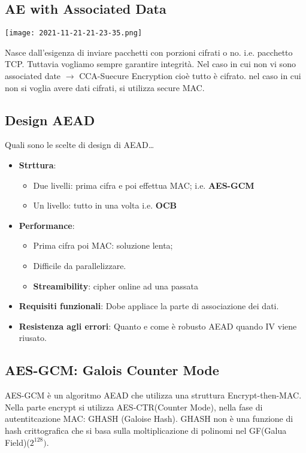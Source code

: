 \documentclass{article}
\theoremstyle{remark}
\begin{document}
\subsection{AE with Associated Data}
\begin{center}
    \texttt{[image: 2021-11-21-21-23-35.png]}
\end{center}
Nasce dall'esigenza di inviare pacchetti con porzioni cifrati o no. i.e. pacchetto TCP. Tuttavia vogliamo sempre garantire
integrità.\newline
Nel caso in cui non vi sono associated date $\rightarrow$ CCA-Suecure Encryption cioè tutto è cifrato. nel caso in cui non si
voglia avere dati cifrati, si utilizza secure MAC.
\subsection{Design AEAD}
Quali sono le scelte di design di AEAD\dots
\begin{itemize}
        \item \textbf{Strttura}: \begin{itemize}
        \item Due livelli: prima cifra e poi effettua MAC; i.e. \textbf{AES-GCM}
        \item Un livello: tutto in una volta i.e. \textbf{OCB}
         \end{itemize}
        \item \textbf{Performance}: \begin{itemize}
        \item Prima cifra poi MAC: soluzione lenta;
        \item Difficile da parallelizzare.
        \item \textbf{Streamibility}: cipher online ad una passata
    \end{itemize}
    \item \textbf{Requisiti funzionali}: Dobe appliace la parte di associazione dei dati.
    \item \textbf{Resistenza agli errori}: Quanto e come è robusto AEAD quando IV viene riusato.
\end{itemize}
\subsection{AES-GCM: Galois Counter Mode}
AES-GCM è un algoritmo AEAD che utilizza una struttura Encrypt-then-MAC. Nella parte encrypt si utilizza AES-CTR(Counter Mode),
nella fase di autentitcazione MAC: GHASH (Galoise Hash). GHASH non è una funzione di hash crittografica che si basa sulla moltiplicazione
di polinomi nel GF(Galua Field)($2^{128})$.\newline
\end{document}
